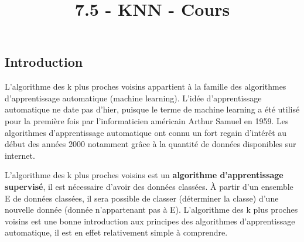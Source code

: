 \documentclass[
  a4paper,
  DIV=11,
  numbers=noendperiod]{scrartcl}
\title{7.5 - KNN - Cours}
\author{}
\date{}
\begin{document}
\maketitle


\subsection{Introduction}\label{introduction}

L'algorithme des k plus proches voisins appartient à la famille des
algorithmes d'apprentissage automatique (machine learning). L'idée
d'apprentissage automatique ne date pas d'hier, puisque le terme de
machine learning a été utilisé pour la première fois par l'informaticien
américain Arthur Samuel en 1959. Les algorithmes d'apprentissage
automatique ont connu un fort regain d'intérêt au début des années 2000
notamment grâce à la quantité de données disponibles sur internet.

L'algorithme des k plus proches voisins est un \textbf{algorithme
d'apprentissage supervisé}, il est nécessaire d'avoir des données
classées. À partir d'un ensemble E de données classées, il sera possible
de classer (déterminer la classe) d'une nouvelle donnée (donnée
n'appartenant pas à E). L'algorithme des k plus proches voisins est une
bonne introduction aux principes des algorithmes d'apprentissage
automatique, il est en effet relativement simple à comprendre.
\end{document}
